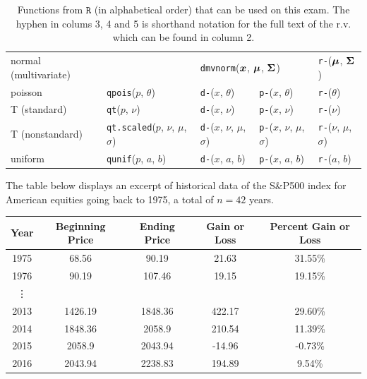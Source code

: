 \documentclass[12pt]{article}
\begin{document}
\begin{table}[htp]
\begin{tabular}{l | llll}
normal (multivariate) & 
& \multicolumn{2}{l}{\texttt{dmvnorm}($\boldsymbol{x}$, $\boldsymbol{\mu}$, $\boldsymbol{\Sigma}$)} 
& \texttt{r-}($\boldsymbol{\mu}$, $\boldsymbol{\Sigma}$) \\

poisson & \texttt{qpois}($p$, $\theta$) 
& \texttt{d-}($x$, $\theta$)
& \texttt{p-}($x$, $\theta$) 
& \texttt{r-}($\theta$) \\

T (standard) & \texttt{qt}($p$, $\nu$) 
& \texttt{d-}($x$, $\nu$) 
& \texttt{p-}($x$, $\nu$)
& \texttt{r-}($\nu$) \\

T (nonstandard) & \texttt{qt.scaled}($p$, $\nu$, $\mu$, $\sigma$) 
& \texttt{d-}($x$, $\nu$, $\mu$, $\sigma$)
& \texttt{p-}($x$, $\nu$, $\mu$, $\sigma$) 
& \texttt{r-}($\nu$, $\mu$, $\sigma$) \\

uniform & \texttt{qunif}($p$, $a$, $b$) 
& \texttt{d-}($x$, $a$, $b$)
& \texttt{p-}($x$, $a$, $b$) 
& \texttt{r-}($a$, $b$) \\
\end{tabular}
\caption{Functions from $\texttt{R}$ (in alphabetical order) that can be used on this exam. The hyphen in colums 3, 4 and 5 is shorthand notation for the full text of the r.v. which can be found in column 2.
}
\label{tab:eqs}
\end{table}

\problem The table below displays an excerpt of historical data of the S\&P500 index for American equities going back to 1975, a total of $n = 42$ years.

\begin{table}[htp]
\centering
\begin{tabular}{c|cccc}
Year & Beginning Price & Ending Price & Gain or Loss & Percent Gain or Loss \\ \hline
1975 & 68.56           & 90.19        & 21.63        & 31.55\%              \\
1976 & 90.19           & 107.46       & 19.15        & 19.15\%              \\
\vdots \\
2013 & 1426.19         & 1848.36      & 422.17       & 29.60\%              \\
2014 & 1848.36         & 2058.9       & 210.54       & 11.39\%              \\
2015 & 2058.9          & 2043.94      & -14.96       & -0.73\%              \\
2016 & 2043.94         & 2238.83      & 194.89       & 9.54\%              
\end{tabular}
\end{table}
\end{document}
